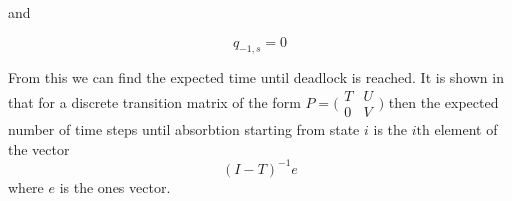 \documentclass{article}
\begin{document}
and

\begin{equation}
  q_{-1, s} = 0
\end{equation}

From this we can find the expected time until deadlock is reached.
It is shown in \cite{stewart09} that for a discrete transition matrix of the form $P = \bigl(\begin{smallmatrix} T & U\\ 0 & V \end{smallmatrix} \bigr)$ then the expected number of time steps until absorbtion starting from state $i$ is the $i\text{th}$ element of the vector
\begin{equation}
  (I - T)^{-1}e
\end{equation}
where $e$ is the ones vector.




\end{document}
